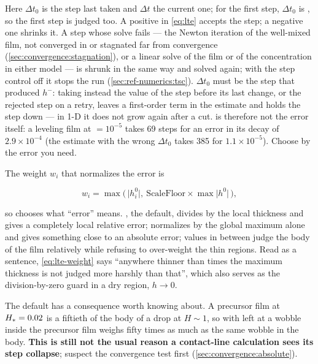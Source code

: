 Here $\Delta t_0$ is the step last taken and $\Delta t$ the current one; for
the first step, $\Delta t_0$ is , so the first step is judged
too. A positive  in \cref{eq:lte} accepts the step; a
negative one shrinks it. A step whose solve fails --- the Newton iteration
of the well-mixed film, not converged in  or
stagnated far from convergence (\cref{sec:convergence:stagnation}), or a
linear solve of the film or of the
concentration in either model --- is shrunk in the same way and solved
again; with the step control off it stops the run
(\cref{sec:ref-numerics:tsc}). $\Delta t_0$ must be the step that produced $h^{-}$:
taking instead the value of the step before its last change, or the rejected
step on a retry, leaves a first-order term in the estimate and holds the step
down --- in 1-D it does not grow again after a cut.  is
therefore not the error itself: a leveling film at 
$= 10^{-5}$ takes 69 steps for an error in its decay of $2.9\times10^{-4}$
(the estimate with the wrong $\Delta t_0$ takes 385 for $1.1\times10^{-5}$).
Choose  by the error you need.

The weight $w_i$ that normalizes the error is

\begin{equation}\label{eq:lte-weight}
  w_i = \max\bigl(\,\lvert h^{0}_{i}\rvert,\
                   \mathrm{ScaleFloor}\times\max\lvert h^{0}\rvert\,\bigr),
\end{equation}

so  chooses what ``error'' means. , the default, divides
by the local thickness and gives a completely local relative error; \val{1}
normalizes by the global maximum alone and gives something close to an absolute
error; values in between judge the body of the film relatively while refusing
to over-weight the thin regions. Read as a sentence, \cref{eq:lte-weight} says
``anywhere thinner than \key{ScaleFloor} times the maximum thickness is not
judged more harshly than that'', which also serves as the division-by-zero guard
in a dry region, $h \to 0$.

The default has a consequence worth knowing about. A precursor film at
$H_{*} = 0.02$ is a fiftieth of the body of a drop at $H \sim 1$, so with
\key{ScaleFloor} left at \val{0} a wobble inside the precursor film weighs
fifty times as much as the same wobble in the body. \textbf{This is still not
the usual reason a contact-line calculation sees its step collapse}; suspect
the convergence test first (\cref{sec:convergence:absolute}).

